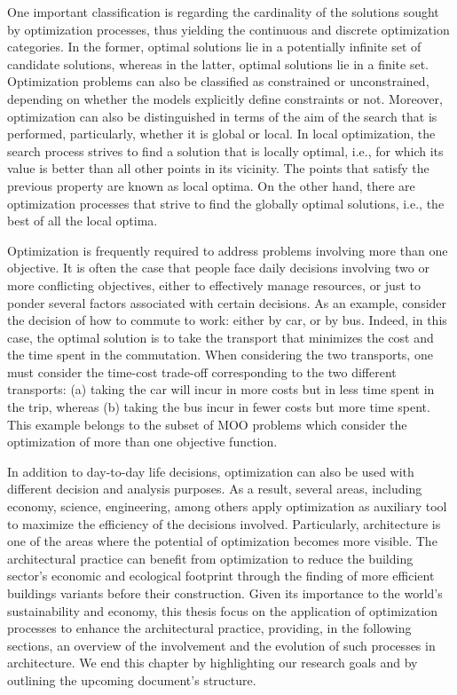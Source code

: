 	One important classification is regarding the cardinality of the solutions sought by optimization processes, thus yielding the continuous and discrete optimization categories. In the former, optimal solutions lie in a potentially infinite set of candidate solutions, whereas in the latter, optimal solutions lie in a finite set. Optimization problems can also be classified as constrained or unconstrained, depending on whether the models explicitly define constraints or not. Moreover, optimization can also be distinguished in terms of the aim of the search that is performed, particularly, whether it is global or local. In local optimization, the search process strives to find a solution that is locally optimal, i.e., for which its value is better than all other points in its vicinity. The points that satisfy the previous property are known as local optima. On the other hand, there are optimization processes that strive to find the globally optimal solutions, i.e., the best of all the local optima.

	Optimization is frequently required to address problems involving more than one objective. It is often the case that people face daily decisions involving two or more conflicting objectives, either to effectively manage resources, or just to ponder several factors associated with certain decisions. As an example, consider the decision of how to commute to work: either by car, or by bus. Indeed, in this case, the optimal solution is to take the transport that minimizes the cost and the time spent in the commutation. When considering the two transports, one must consider the time-cost trade-off corresponding to the two different transports: (a) taking the car will incur in more costs but in less time spent in the trip, whereas (b) taking the bus incur in fewer costs but more time spent. This example belongs to the subset of \ac{MOO} problems which consider the optimization of more than one objective function. 

	In addition to day-to-day life decisions, optimization can also be used with different decision and analysis purposes. As a result, several areas, including economy, science, engineering, among others apply optimization as auxiliary tool to maximize the efficiency of the decisions involved. Particularly, architecture is one of the areas where the potential of optimization becomes more visible. The architectural practice can benefit from optimization to reduce the building sector's economic and ecological footprint through the finding of more efficient buildings variants before their construction. Given its importance to the world's sustainability and economy, this thesis focus on the application of optimization processes to enhance the architectural practice, providing, in the following sections, an overview of the involvement and the evolution of such processes in architecture. We end this chapter by highlighting our research goals and by outlining the upcoming document's structure.

